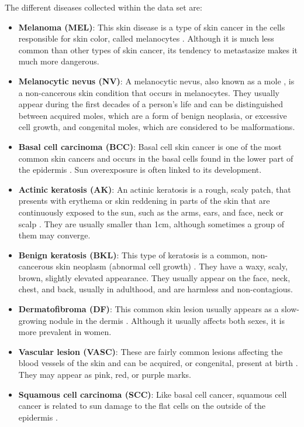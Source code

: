 The different diseases collected within the data set are: 

\begin{itemize}
    \item \textbf{Melanoma (MEL)}: This skin disease is a type of skin cancer in the cells responsible for skin color, called melanocytes \cite{melanoma_American_cancer_society}. Although it is much less common than other types of skin cancer, its tendency to metastasize makes it much more dangerous.
    \item \textbf{Melanocytic nevus (NV)}: A melanocytic nevus, also known as a mole \cite{noauthor_melanocytic_2023}, is a non-cancerous skin condition that occurs in melanocytes. They usually appear during the first decades of a person's life and can be distinguished between acquired moles, which are a form of benign neoplasia, or excessive cell growth, and congenital moles, which are considered to be malformations.
    \item \textbf{Basal cell carcinoma (BCC)}: Basal cell skin cancer is one of the most common skin cancers and occurs in the basal cells found in the lower part of the epidermis \cite{basal_cell_American_cancer_society}. Sun overexposure is often linked to its development.
    \item \textbf{Actinic keratosis (AK)}: An actinic keratosis is a rough, scaly patch, that presents with erythema or skin reddening in parts of the skin that are continuously exposed to the sun, such as the arms, ears, and face, neck or scalp \cite{carmena-ramon_queratosis_2017}. They are usually smaller than 1cm, although sometimes a group of them may converge.
    \item \textbf{Benign keratosis (BKL)}: This type of keratosis is a common, non-cancerous skin neoplasm (abnormal cell growth) \cite{noauthor_queratosis_nodate}. They have a waxy, scaly, brown, slightly elevated appearance. They usually appear on the face, neck, chest, and back, usually in adulthood, and are harmless and non-contagious.
    \item \textbf{Dermatofibroma (DF)}: This common skin lesion usually appears as a slow-growing nodule in the dermis \cite{hueso_dermatofibroma_2007}. Although it usually affects both sexes, it is more prevalent in women.
    \item \textbf{Vascular lesion (VASC)}: These are fairly common lesions affecting the blood vessels of the skin and can be acquired, or congenital, present at birth \cite{noauthor_vascular_nodate}. They may appear as pink, red, or purple marks.
    \item \textbf{Squamous cell carcinoma (SCC)}: Like basal cell cancer, squamous cell cancer is related to sun damage to the flat cells on the outside of the epidermis \cite{basal_cell_American_cancer_society}.

\end{itemize}

